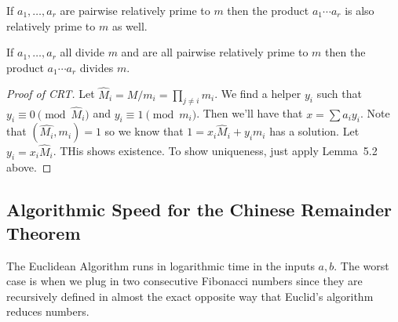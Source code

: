 \begin{lemma}
If $a_1, \dotsc, a_r$ are pairwise relatively prime to $m$ then the product $a_1 \cdots a_r$ is also relatively prime to $m$ as well.
\end{lemma}

\begin{lemma}
If $a_1, \dotsc, a_r$ all divide $m$ and are all pairwise relatively prime to $m$ then the product $a_1 \cdots a_r$ divides $m$.
\end{lemma}

\begin{proof}[Proof of CRT]
Let $\hat{M}_i = M/m_i = \prod_{j \not= i} m_i$. We find a helper $y_i$ such that $y_i \equiv 0 \pmod{\hat{M}_i}$ and $y_i \equiv 1 \pmod{m_i}$. Then we'll have that $x = \sum a_iy_i$. Note that $(\hat{M_i}, m_i) = 1$ so we know that $1 = x_i\hat{M}_i + y_im_i$ has a solution. Let $y_i = x_i\hat{M}_i$. THis shows existence. To show uniqueness, just apply Lemma~5.2 above.
\end{proof}

\subsection{Algorithmic Speed for the Chinese Remainder Theorem}

The Euclidean Algorithm runs in logarithmic time in the inputs $a,b$. The worst case is when we plug in two consecutive Fibonacci numbers since they are recursively defined in almost the exact opposite way that Euclid's algorithm reduces numbers.